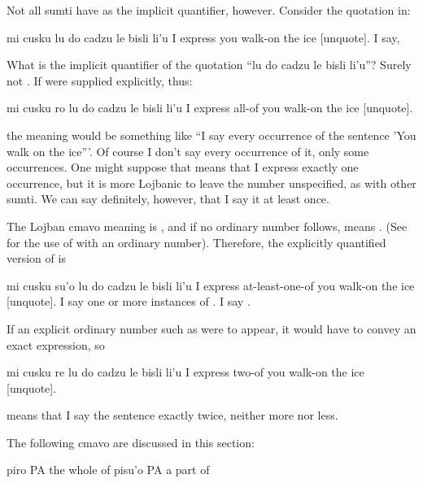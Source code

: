 Not all sumti have  as the implicit quantifier,
    however. Consider the quotation in:
\begin{example}
mi cusku lu do cadzu le bisli li'u\n
I express  you walk-on the ice [unquote].\n
I say, 
\end{example}

What is the implicit quantifier of the quotation ``lu do
    cadzu le bisli li'u''? Surely not . If  were
    supplied explicitly, thus:
\begin{example}
mi cusku ro lu do cadzu le bisli li'u\n
I express all-of  you walk-on the ice [unquote].
\end{example}

{\noindent}the meaning would be something like ``I say every occurrence of
    the sentence 'You walk on the ice'''. Of course I don't say
    every occurrence of it, only some occurrences. One might
    suppose that  means that I
    express exactly one occurrence, but it is more Lojbanic to
    leave the number unspecified, as with other sumti. We can say
    definitely, however, that I say it at least once. 

The Lojban cmavo meaning  is , and if no
    ordinary number follows,  means . (See for the use of  with an
    ordinary number). Therefore, the explicitly quantified version
    of  is
\begin{example}
mi cusku su'o lu do cadzu\n
\T	le bisli li'u\n
I express at-least-one-of  you walk-on\n
\T	the ice [unquote].\n
I say one or more instances of .\n
I say .
\end{example}

If an explicit ordinary number such as  were to
    appear, it would have to convey an exact expression, so
\begin{example}
mi cusku re lu do cadzu le bisli li'u\n
I express two-of  you walk-on the ice [unquote].
\end{example}

{\noindent}means that I say the sentence exactly twice, neither more nor
    less.



The following cmavo are discussed in this section:

   piro    PA  the whole of
    pisu'o  PA  a part of

